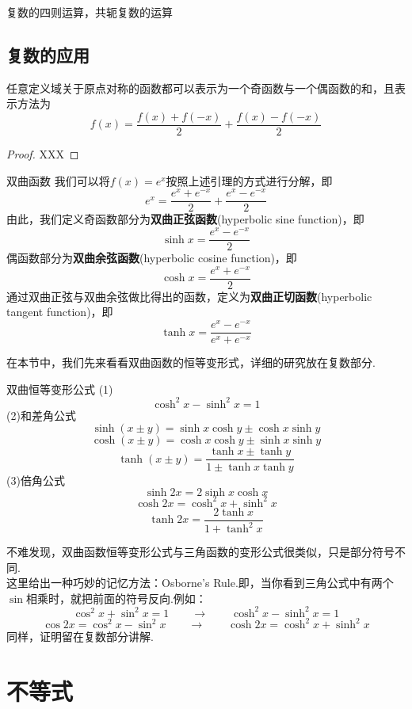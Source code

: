 \documentclass[lang=cn, zihao=5]{elegantbook}
\begin{document}
复数的四则运算，共轭复数的运算

\section{复数的应用}

\begin{lemma}
    任意定义域关于原点对称的函数都可以表示为一个奇函数与一个偶函数的和，且表示方法为$$f(x)=\frac{f(x)+f(-x)}{2}+\frac{f(x)-f(-x)}{2}$$
\end{lemma}
\begin{proof}
    XXX
\end{proof}

\begin{definition}{双曲函数}
    我们可以将$f(x)=e^x$按照上述引理的方式进行分解，即$$e^x=\frac{e^x+e^{-x}}{2}+\frac{e^x-e^{-x}}{2}$$
    由此，我们定义奇函数部分为\textbf{双曲正弦函数}(hyperbolic sine function)，即$$\sinh{x}=\frac{e^x-e^{-x}}{2}$$
    偶函数部分为\textbf{双曲余弦函数}(hyperbolic cosine function)，即$$\cosh{x}=\frac{e^x+e^{-x}}{2}$$
    通过双曲正弦与双曲余弦做比得出的函数，定义为\textbf{双曲正切函数}(hyperbolic tangent function)，即$$\tanh{x}=\frac{e^x-e^{-x}}{e^x+e^{-x}}$$
\end{definition}

在本节中，我们先来看看双曲函数的恒等变形式，详细的研究放在复数部分.

\begin{proposition}{双曲恒等变形公式}
    (1)$$\cosh^2{x}-\sinh^2{x}=1$$
    (2)和差角公式
    $$\sinh{(x \pm y)}=\sinh{x}\cosh{y} \pm \cosh{x}\sinh{y}$$
    $$\cosh{(x \pm y)}=\cosh{x}\cosh{y} \pm \sinh{x}\sinh{y}$$
    $$\tanh{(x \pm y)}=\frac{\tanh{x} \pm \tanh{y}}{1 \pm \tanh{x}\tanh{y}}$$
    (3)倍角公式
    $$\sinh{2x}=2\sinh{x}\cosh{x}$$
    $$\cosh{2x}=\cosh^2{x}+\sinh^2{x}$$
    $$\tanh{2x}=\frac{2\tanh{x}}{1+\tanh^2{x}}$$
\end{proposition}
\begin{remark}
    不难发现，双曲函数恒等变形公式与三角函数的变形公式很类似，只是部分符号不同.\\
    这里给出一种巧妙的记忆方法：Osborne's Rule.即，当你看到三角公式中有两个$\sin$相乘时，就把前面的符号反向.例如：$$\cos^2{x}+\sin^2{x}=1 \qquad \longrightarrow \qquad \cosh^2{x}-\sinh^2{x}=1$$
    $$\cos{2x}=\cos^2{x}-\sin^2{x} \qquad \longrightarrow \qquad \cosh{2x}=\cosh^2{x}+\sinh^2{x}$$
    同样，证明留在复数部分讲解.
\end{remark}


\chapter{不等式}
\end{document}
